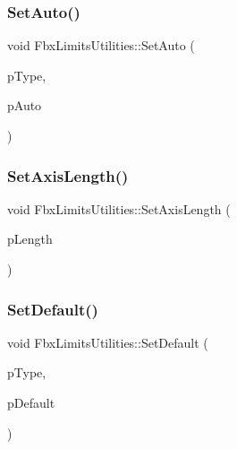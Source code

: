 \mbox{\label{class_fbx_limits_utilities_a290ae79085beea63b37f3a9953e03709}} 
\subsubsection{\texorpdfstring{Set\+Auto()}{SetAuto()}}
{\footnotesize\ttfamily void Fbx\+Limits\+Utilities\+::\+Set\+Auto (\begin{DoxyParamCaption}\item[{\hyperlink{class_fbx_limits_utilities_aa55167751039b3d64b56cb7e58f2e62c}{E\+Type}}]{p\+Type,  }\item[{bool}]{p\+Auto }\end{DoxyParamCaption})}

\mbox{\label{class_fbx_limits_utilities_a0823e9206b2adba552e54811dfe11378}} 
\subsubsection{\texorpdfstring{Set\+Axis\+Length()}{SetAxisLength()}}
{\footnotesize\ttfamily void Fbx\+Limits\+Utilities\+::\+Set\+Axis\+Length (\begin{DoxyParamCaption}\item[{double}]{p\+Length }\end{DoxyParamCaption})}

\mbox{\label{class_fbx_limits_utilities_a89d6cb2e0dcdc0fc12f520a9b1ea9326}} 
\subsubsection{\texorpdfstring{Set\+Default()}{SetDefault()}}
{\footnotesize\ttfamily void Fbx\+Limits\+Utilities\+::\+Set\+Default (\begin{DoxyParamCaption}\item[{\hyperlink{class_fbx_limits_utilities_aa55167751039b3d64b56cb7e58f2e62c}{E\+Type}}]{p\+Type,  }\item[{\hyperlink{class_fbx_vector4}{Fbx\+Vector4}}]{p\+Default }\end{DoxyParamCaption})}

